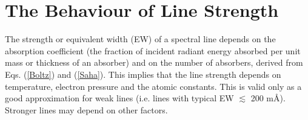 \documentclass[dvips,12pt,a4paper]{report}
\begin{document}
{%
















\section{The Behaviour of Line Strength}
\label{linestr}
The strength or equivalent width (EW) of a spectral line depends on the absorption coefficient (the fraction of incident radiant energy absorbed per unit mass or thickness of an absorber) and on the number of absorbers, derived from Eqs. (\ref{Boltz}) and (\ref{Saha}). This implies that the line strength depends on temperature, electron pressure and the atomic constants. This is valid only as a good approximation for weak lines (i.e. lines with typical EW $\lesssim$ 200 m\AA). Stronger lines may depend on other factors.

}
\end{document}
